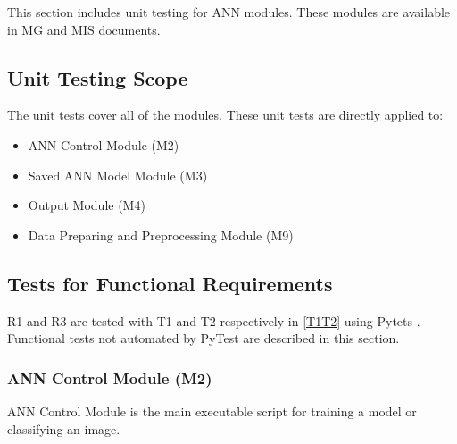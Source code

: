 \documentclass[12pt, titlepage]{article}
\begin{document}
This section includes unit testing for ANN modules. 
These modules are available in MG \citep{MG} and 
MIS \citep{MIS} documents.

\subsection{Unit Testing Scope}

The unit tests cover all of the modules. 
These unit tests are directly applied to:

\begin{itemize}
  \item ANN Control Module (M2)
  \item Saved ANN Model Module (M3)
  \item Output Module (M4)
  \item Data Preparing and Preprocessing Module (M9)
\end{itemize}

\subsection{Tests for Functional Requirements}

R1 and R3 are tested with T1 and T2 respectively in \ref{T1T2} using Pytets \citep{pytest}. 
Functional tests not automated by PyTest \citep{pytest} are described in this section.


\subsubsection{ ANN Control Module (M2)}
ANN Control Module is the main executable script for training a model or classifying an image.
\end{document}
